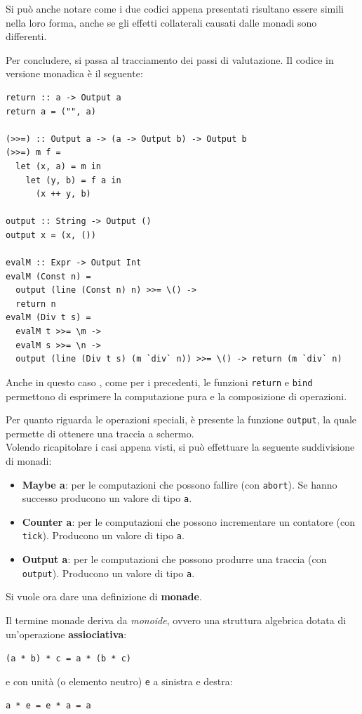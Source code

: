 \documentclass{article}
\begin{document}
Si può anche notare come i due codici appena presentati risultano essere simili nella loro forma, anche se gli effetti collaterali causati dalle monadi sono differenti.

\pagebreak

Per concludere, si passa al tracciamento dei passi di valutazione. Il codice in versione monadica è il seguente:
\begin{tcolorbox}
\begin{verbatim}
return :: a -> Output a
return a = ("", a)

(>>=) :: Output a -> (a -> Output b) -> Output b
(>>=) m f =
  let (x, a) = m in
    let (y, b) = f a in
      (x ++ y, b)

output :: String -> Output ()
output x = (x, ())

evalM :: Expr -> Output Int
evalM (Const n) =
  output (line (Const n) n) >>= \() ->
  return n
evalM (Div t s) =
  evalM t >>= \m ->
  evalM s >>= \n ->
  output (line (Div t s) (m `div` n)) >>= \() -> return (m `div` n)
\end{verbatim}
\end{tcolorbox}
Anche in questo caso , come per i precedenti, le funzioni \texttt{return} e \texttt{bind} permettono di esprimere la computazione pura e la composizione di operazioni.

Per quanto riguarda le operazioni speciali, è presente la funzione \texttt{output}, la quale permette di ottenere una traccia a schermo.\vspace{14pt}\\
Volendo ricapitolare i casi appena visti, si può effettuare la seguente suddivisione di monadi:
\begin{itemize}
    \item \textbf{Maybe a}: per le computazioni che possono fallire (con \texttt{abort}). Se hanno successo producono un valore di tipo \texttt{a}.
    \item \textbf{Counter a}: per le computazioni che possono incrementare un contatore (con \texttt{tick}). Producono un valore di tipo \texttt{a}.
    \item \textbf{Output a}: per le computazioni che possono produrre una traccia (con \texttt{output}). Producono un valore di tipo \texttt{a}.
\end{itemize}

\pagebreak

Si vuole ora dare una definizione di \textbf{monade}.

Il termine monade deriva da \textit{monoide}, ovvero una struttura algebrica dotata di un'operazione \textbf{assiociativa}:
\begin{center}
    \texttt{(a * b) * c = a * (b * c)}
\end{center}
e con unità (o elemento neutro) \texttt{e} a sinistra e destra:
\begin{center}
    \texttt{a * e = e * a = a}
\end{center}
\end{document}
